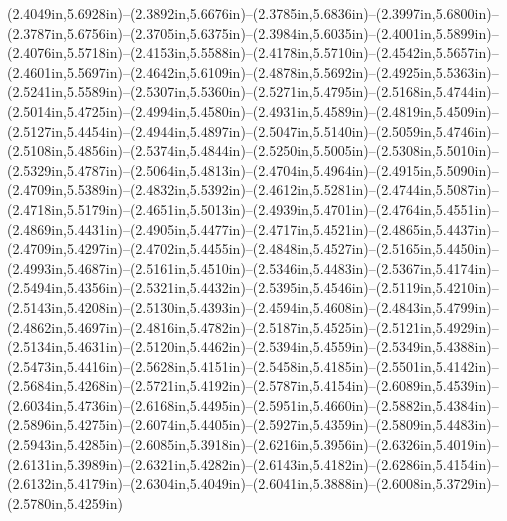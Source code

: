 (2.4049in,5.6928in)--(2.3892in,5.6676in)--(2.3785in,5.6836in)--(2.3997in,5.6800in)--(2.3787in,5.6756in)--(2.3705in,5.6375in)--(2.3984in,5.6035in)--(2.4001in,5.5899in)--(2.4076in,5.5718in)--(2.4153in,5.5588in)--(2.4178in,5.5710in)--(2.4542in,5.5657in)--(2.4601in,5.5697in)--(2.4642in,5.6109in)--(2.4878in,5.5692in)--(2.4925in,5.5363in)--(2.5241in,5.5589in)--(2.5307in,5.5360in)--(2.5271in,5.4795in)--(2.5168in,5.4744in)--(2.5014in,5.4725in)--(2.4994in,5.4580in)--(2.4931in,5.4589in)--(2.4819in,5.4509in)--(2.5127in,5.4454in)--(2.4944in,5.4897in)--(2.5047in,5.5140in)--(2.5059in,5.4746in)--(2.5108in,5.4856in)--(2.5374in,5.4844in)--(2.5250in,5.5005in)--(2.5308in,5.5010in)--(2.5329in,5.4787in)--(2.5064in,5.4813in)--(2.4704in,5.4964in)--(2.4915in,5.5090in)--(2.4709in,5.5389in)--(2.4832in,5.5392in)--(2.4612in,5.5281in)--(2.4744in,5.5087in)--(2.4718in,5.5179in)--(2.4651in,5.5013in)--(2.4939in,5.4701in)--(2.4764in,5.4551in)--(2.4869in,5.4431in)--(2.4905in,5.4477in)--(2.4717in,5.4521in)--(2.4865in,5.4437in)--(2.4709in,5.4297in)--(2.4702in,5.4455in)--(2.4848in,5.4527in)--(2.5165in,5.4450in)--(2.4993in,5.4687in)--(2.5161in,5.4510in)--(2.5346in,5.4483in)--(2.5367in,5.4174in)--(2.5494in,5.4356in)--(2.5321in,5.4432in)--(2.5395in,5.4546in)--(2.5119in,5.4210in)--(2.5143in,5.4208in)--(2.5130in,5.4393in)--(2.4594in,5.4608in)--(2.4843in,5.4799in)--(2.4862in,5.4697in)--(2.4816in,5.4782in)--(2.5187in,5.4525in)--(2.5121in,5.4929in)--(2.5134in,5.4631in)--(2.5120in,5.4462in)--(2.5394in,5.4559in)--(2.5349in,5.4388in)--(2.5473in,5.4416in)--(2.5628in,5.4151in)--(2.5458in,5.4185in)--(2.5501in,5.4142in)--(2.5684in,5.4268in)--(2.5721in,5.4192in)--(2.5787in,5.4154in)--(2.6089in,5.4539in)--(2.6034in,5.4736in)--(2.6168in,5.4495in)--(2.5951in,5.4660in)--(2.5882in,5.4384in)--(2.5896in,5.4275in)--(2.6074in,5.4405in)--(2.5927in,5.4359in)--(2.5809in,5.4483in)--(2.5943in,5.4285in)--(2.6085in,5.3918in)--(2.6216in,5.3956in)--(2.6326in,5.4019in)--(2.6131in,5.3989in)--(2.6321in,5.4282in)--(2.6143in,5.4182in)--(2.6286in,5.4154in)--(2.6132in,5.4179in)--(2.6304in,5.4049in)--(2.6041in,5.3888in)--(2.6008in,5.3729in)--(2.5780in,5.4259in)
